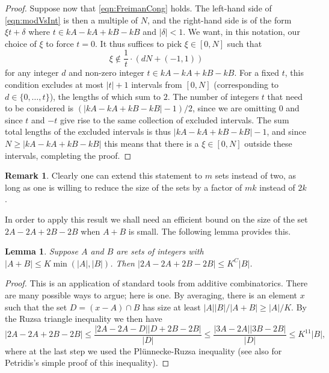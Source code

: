 \documentclass[12pt,a4paper,reqno]{amsart}
\numberwithin{equation}{section}
\theoremstyle{plain}
\newtheorem{lemma}[subsection]{Lemma}
\theoremstyle{definition}
\newtheorem{remark}[subsection]{Remark}
\renewcommand{\leq}{\leqslant}
\renewcommand{\geq}{\geqslant}
\providecommand{\abs}[1]{\lvert#1\rvert}
\theoremstyle{plain}
\begin{document}
\begin{proof}
Suppose now that \eqref{eqn:FreimanCong} holds. The left-hand side of \eqref{eqn:modVsInt} is then a multiple of $N$, and the right-hand side is of the form $\xi t + \delta$ where $t \in kA-kA+kB-kB$ and $\abs{\delta} < 1$. We want, in this notation, our choice of $\xi$ to force $t = 0$. It thus suffices to pick $\xi \in [0,N]$ such that
\[ \xi \notin \frac{1}{t}\cdot(dN + (-1,1)) \]
for any integer $d$ and non-zero integer $t \in kA-kA+kB-kB$. For a fixed $t$, this condition excludes at most $\abs{t}+1$ intervals from $[0,N]$ (corresponding to $d \in \{0,\ldots,t\}$), the lengths of which sum to $2$. The number of integers $t$ that need to be considered is $(\abs{kA-kA+kB-kB}-1)/2$, since we are omitting $0$ and since $t$ and $-t$ give rise to the same collection of excluded intervals. The sum total lengths of the excluded intervals is thus $\abs{kA-kA+kB-kB}-1$, and since $N \geq \abs{kA-kA+kB-kB}$ this means that there is a $\xi \in [0,N]$ outside these intervals, completing the proof.
\end{proof}

\begin{remark}
Clearly one can extend this statement to $m$ sets instead of two, as long as one is willing to reduce the size of the sets by a factor of $mk$ instead of $2k$.
\end{remark}

In order to apply this result we shall need an efficient bound on the size of the set $2A-2A+2B-2B$ when $A+B$ is small. The following lemma provides this.

\begin{lemma}\label{lemma:plunnecke}
Suppose $A$ and $B$ are sets of integers with $\abs{A+B} \leq K\min(\abs{A}, \abs{B})$. Then 
$\abs{2A-2A+2B-2B}\leq K^{C} \abs{B}$.
\end{lemma}
\begin{proof}
This is an application of standard tools from additive combinatorics. There are many possible ways to argue; here is one. By averaging, there is an element $x$ such that the set $D = (x-A) \cap B$ has size at least $\abs{A}\abs{B}/\abs{A+B} \geq \abs{A}/K$. By the Ruzsa triangle inequality \cite[Lemma 2.6]{tao-vu} we then have
\[ \abs{2A-2A+2B-2B} \leq \frac{\abs{2A-2A-D}\abs{D+2B-2B}}{\abs{D}} \leq \frac{\abs{3A-2A}\abs{3B-2B}}{\abs{D}} \leq K^{11} \abs{B}, \]
where at the last step we used the Pl\"unnecke-Ruzsa inequality \cite[Corollary 6.29]{tao-vu} (see also \cite{petridis} for Petridis's simple proof of this inequality). \end{proof}
\end{document}
